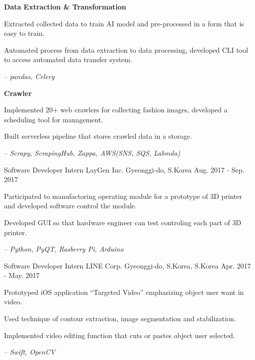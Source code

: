 \begin{cventries}
{\begin{cvitems}
\begin{itemize}
        \end{itemize}
        \item[] {\textbf{Data Extraction \& Transformation}}
        \item {Extracted collected data to train AI model and pre-processed in a form that is easy to train.}
        \item {Automated process from data extraction to data processing, developed CLI tool to access automated data transfer system.}
        \item[--] \textit{pandas, Celery}
        \item[] {\textbf{Crawler}}
        \item {Implemented 20+ web crawlers for collecting fashion images, developed a scheduling tool for management.} 
        \item {Built serverless pipeline that stores crawled data in a storage.}
        \item[--] \textit{Scrapy, ScrapingHub, Zappa, AWS(SNS, SQS, Labmda)}
      \end{cvitems}
    }

  \cventry
    {Software Developer Intern} %
    {LayGen Inc.} %
    {Gyeonggi-do, S.Korea} %
    {Aug. 2017 - Sep. 2017} %
    {
      \begin{cvitems} %
        \item {Participated to manufactoring operating module for a prototype of 3D printer and developed software control the module.}
        \item {Developed GUI so that hardware engineer can test controling each part of 3D printer.}
        \item[--] \textit{Python, PyQT, Rasberry Pi, Arduino}
      \end{cvitems}
    }

  \cventry
    {Software Developer Intern} %
    {LINE Corp.} %
    {Gyeonggi-do, S.Korea, S.Korea} %
    {Apr. 2017 - May. 2017} %
    {
      \begin{cvitems} %
        \item {Prototyped iOS application ``Targeted Video'' emphasizing object user want in video.}
        \item {Used technique of contour extraction, image segmentation and stabilization.}
        \item {Implemented video editing function that cuts or pastes object user selected.}
        \item[--] \textit{Swift, OpenCV}
      \end{cvitems}
    }


\end{cventries}
